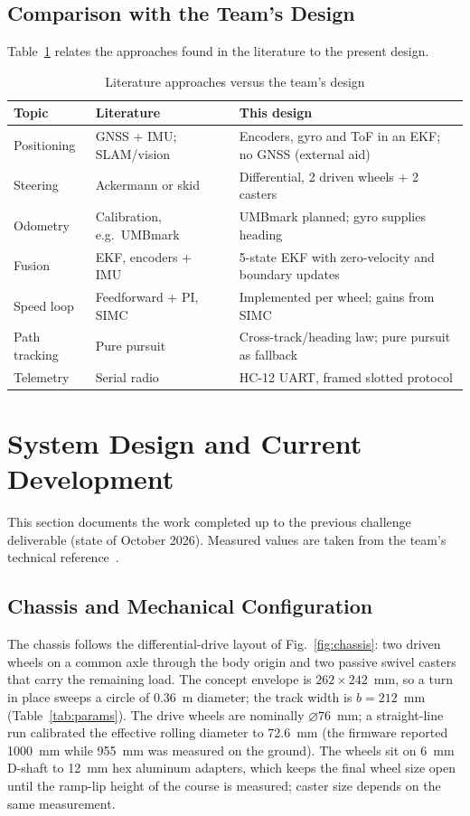 \documentclass[conference]{IEEEtran}\newcommand{\haveieee}{}%
\begin{document}
\subsection{Comparison with the Team's Design}
Table~\ref{tab:sota} relates the approaches found in the literature to the present design.

\begin{table}[!t]
\caption{Literature approaches versus the team's design}
\label{tab:sota}
\centering\footnotesize
\setlength{\tabcolsep}{3pt}
\begin{tabular}{@{}p{1.6cm}p{2.9cm}p{3.1cm}@{}}
\toprule
\textbf{Topic} & \textbf{Literature} & \textbf{This design}\\
\midrule
Positioning & GNSS + IMU; SLAM/vision~\cite{wu2025,boros2026} & Encoders, gyro and ToF in an EKF; no GNSS (external aid)\\
Steering & Ackermann or skid~\cite{maclaurin2008,goodell2019} & Differential, 2 driven wheels + 2 casters\\
Odometry & Calibration, e.g.\ UMBmark~\cite{borenstein1996} & UMBmark planned; gyro supplies heading\\
Fusion & EKF, encoders + IMU~\cite{amorim2025} & 5-state EKF with zero-velocity and boundary updates\\
Speed loop & Feedforward + PI, SIMC~\cite{skogestad2003} & Implemented per wheel; gains from SIMC\\
Path tracking & Pure pursuit~\cite{giesbrecht2005,snider2009} & Cross-track/heading law; pure pursuit as fallback\\
Telemetry & Serial radio~\cite{hc12} & HC-12 UART, framed slotted protocol\\
\bottomrule
\end{tabular}
\end{table}

\section{System Design and Current Development}
This section documents the work completed up to the previous challenge deliverable (state of October 2026). Measured values are taken from the team's technical reference~\cite{techref}.

\subsection{Chassis and Mechanical Configuration}
The chassis follows the differential-drive layout of Fig.~\ref{fig:chassis}: two driven wheels on a common axle through the body origin and two passive swivel casters that carry the remaining load. The concept envelope is $262\times242$~mm, so a turn in place sweeps a circle of 0.36~m diameter; the track width is $b=212$~mm (Table~\ref{tab:params}). The drive wheels are nominally $\varnothing 76$~mm; a straight-line run calibrated the effective rolling diameter to 72.6~mm (the firmware reported 1000~mm while 955~mm was measured on the ground). The wheels sit on 6~mm D-shaft to 12~mm hex aluminum adapters, which keeps the final wheel size open until the ramp-lip height of the course is measured; caster size depends on the same measurement.
\end{document}
